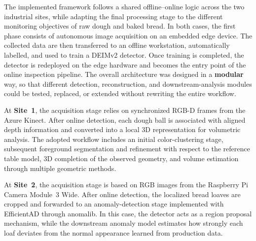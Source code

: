 
The implemented framework follows a shared offline--online logic across the two industrial sites, while adapting the final processing stage to the different monitoring objectives of raw dough and baked bread. In both cases, the first phase consists of autonomous image acquisition on an embedded edge device. The collected data are then transferred to an offline workstation, automatically labelled, and used to train a DEIMv2 detector. Once training is completed, the detector is redeployed on the edge hardware and becomes the entry point of the online inspection pipeline.\cite{labby_thesis_repo_2026,labby_kinect_acquisition_2026} The overall architecture was designed in a \textbf{modular} way, so that different detection, reconstruction, and downstream-analysis modules could be tested, replaced, or extended without rewriting the entire workflow.\cite{labby_thesis_repo_2026}

At \textbf{Site~1}, the acquisition stage relies on synchronized RGB-D frames from the Azure Kinect.\cite{microsoft_azure_nodate} After online detection, each dough ball is associated with aligned depth information and converted into a local 3D representation for volumetric analysis. The adopted workflow includes an initial color-clustering stage, subsequent foreground segmentation and refinement with respect to the reference table model, 3D completion of the observed geometry, and volume estimation through multiple geometric methods.\cite{labby_thesis_repo_2026}

At \textbf{Site~2}, the acquisition stage is based on RGB images from the Raspberry Pi Camera Module~3 Wide.\cite{raspberrypi_camera_module_3_2026} After online detection, the localized bread loaves are cropped and forwarded to an anomaly-detection stage implemented with EfficientAD through anomalib.\cite{batzner_efficientad_2024,akcay_anomalib_2022} In this case, the detector acts as a region proposal mechanism, while the downstream anomaly model estimates how strongly each loaf deviates from the normal appearance learned from production data.\cite{labby_thesis_repo_2026}
